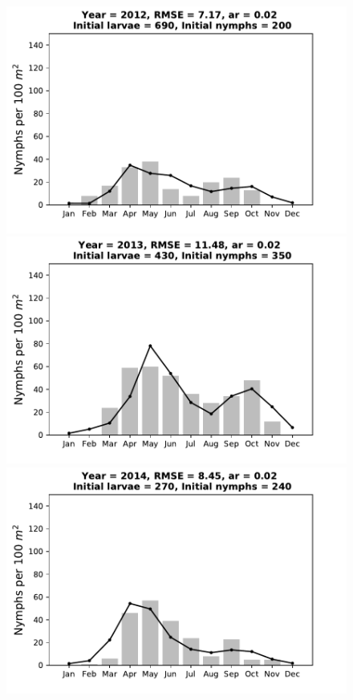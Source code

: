 \documentclass[a4paper, 11pt]{scrartcl}
\begin{document}
\begin{figure}[h!]
\begin{minipage}[c]{0.40\linewidth}
\end{minipage}
\begin{minipage}[c]{0.40\linewidth}
\includegraphics[width=\linewidth]{figures/s3/s3_2012}
\end{minipage}
\begin{minipage}[c]{0.40\linewidth}
\includegraphics[width=\linewidth]{figures/s3/s3_2013}
\end{minipage}
\begin{minipage}[c]{0.40\linewidth}
\includegraphics[width=\linewidth]{figures/s3/s3_2014}

\end{minipage}
\end{figure}
\end{document}
